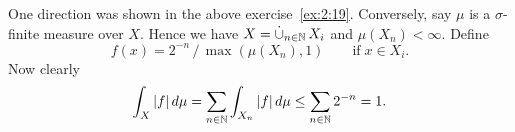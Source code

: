 \begin{enumerate}
One direction was shown in the above exercise~\ref{ex:2:19}.
Conversely, say \(\mu\) is a \(\sigma\)-finite measure over $X$.
Hence we have \(X = \disjunion_{n\in\N} X_i\) and \(\mu(X_n)<\infty\).
Define
\begin{equation*}
f(x) = 2^{-n}\,/\,\max(\mu(X_n),1) \qquad \textrm{if}\; x \in X_i.
\end{equation*}
Now clearly
\begin{equation*}
\int_X |f|\,d\mu
 = \sum_{n\in\mathbb{N}} \int_{X_n} |f|\,d\mu
 \leq \sum_{n\in\mathbb{N}} 2^{-n} = 1.
\end{equation*}


\end{enumerate}
